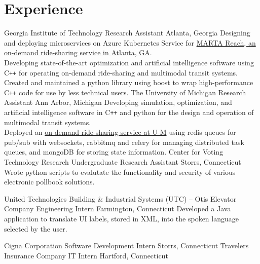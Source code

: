 \section{Experience}
		{Georgia Institute of Technology}
		{Research Assistant}
		{Atlanta, Georgia}{}
		{Designing and deploying microservices on Azure Kubernetes Service for \href{https://www.itsmarta.com/reach.aspx}{MARTA Reach, an on-demand ride-sharing service in Atlanta, GA}. \\
        Developing state-of-the-art optimization and artificial intelligence software using C\texttt{++} for operating on-demand ride-sharing and multimodal transit systems. \\
        Created and maintained a python library using boost to wrap high-performance C\texttt{++} code for use by less technical users.}
		{The University of Michigan}
		{Research Assistant}
		{Ann Arbor, Michigan}{}
		{Developing simulation, optimization, and artificial intelligence software in C\texttt{++} and python for the design and operation of multimodal transit systems. \\
		Deployed an \href{https://record.umich.edu/articles/north-campus-first-test-site-hybrid-transportation-system/}{on-demand ride-sharing service at U-M} using redis queues for pub/sub with websockets, rabbitmq and celery for managing distributed task queues, and mongoDB for storing state information.}
		{Center for Voting Technology Research}
		{Undergraduate Research Assistant}
		{Storrs, Connecticut}{}
        {Wrote python scripts to evalutate the functionality and security of various electronic pollbook solutions.}

		{United Technologies Building \& Industrial Systems (UTC) -- Otis Elevator Company}
		{Engineering Intern}
		{Farmington, Connecticut}{}
		{Developed a Java application to translate UI labels, stored in XML, into the spoken language selected by the user.}

		{Cigna Corporation}
		{Software Development Intern}
		{Storrs, Connecticut}{}
        {}
		{Travelers Insurance Company}
		{IT Intern}
		{Hartford, Connecticut}{}
        {}
